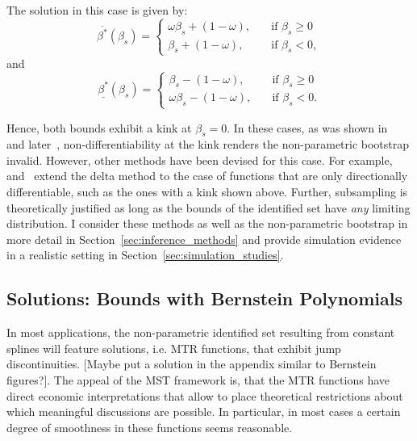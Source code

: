 \documentclass[12pt,a4paper,english]{article} %
\numberwithin{equation}{section}
\numberwithin{figure}{section}
\numberwithin{table}{section}
\begin{document}
The solution in this case is given by:
\begin{equation}
	\overline{\beta^*}(\beta_s)=
	\begin{cases}
		\omega \beta_s + (1 - \omega),& \quad \text{if } \beta_s \geq 0\\
		\beta_s + (1 - \omega),              & \quad \text{if } \beta_s < 0,
	\end{cases}
\end{equation}
and
\begin{equation}
	\underline{\beta^*}(\beta_s)=
	\begin{cases}
		\beta_s - (1 - \omega),& \quad \text{if } \beta_s \geq 0\\
		\omega \beta_s - (1 - \omega),              & \quad \text{if } \beta_s < 0.
	\end{cases}
\end{equation}

Hence, both bounds exhibit a kink at $\beta_s=0$.
In these cases, as was shown in~\cite{dumbgen1993nondifferentiable} and later~\cite{fang2019infdirdiff}, non-differentiability at the kink renders the non-parametric bootstrap invalid.
However, other methods have been devised for this case. For example,~\cite{fang2019infdirdiff} and~\cite{hong2018numerical} extend the delta method to the case of functions that are only directionally differentiable, such as the ones with a kink shown above.
Further, subsampling is theoretically justified as long as the bounds of the identified set have \textit{any} limiting distribution.
I consider these methods as well as the non-parametric bootstrap in more detail in Section~\ref{sec:inference_methods} and provide simulation evidence in a realistic setting in Section~\ref{sec:simulation_studies}.

\subsection{Solutions: Bounds with Bernstein Polynomials}
In most applications, the non-parametric identified set resulting from constant splines will feature solutions, i.e. MTR functions, that exhibit jump discontinuities.
[Maybe put a solution in the appendix similar to Bernstein figures?].
The appeal of the MST framework is, that the MTR functions have direct economic interpretations that allow to place theoretical restrictions about which meaningful discussions are possible.
In particular, in most cases a certain degree of smoothness in these functions seems reasonable.
\end{document}
